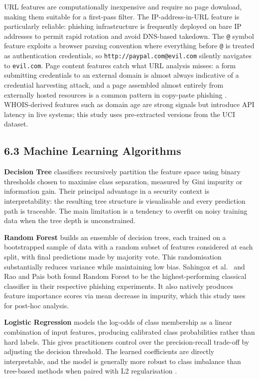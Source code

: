 \documentclass[11pt,letterpaper]{article}
\begin{document}
URL features are computationally inexpensive and require no page download, making them suitable for a first-pass filter. The IP-address-in-URL feature is particularly reliable: phishing infrastructure is frequently deployed on bare IP addresses to permit rapid rotation and avoid DNS-based takedown. The \texttt{@} symbol feature exploits a browser parsing convention where everything before \texttt{@} is treated as authentication credentials, so \texttt{http://paypal.com@evil.com} silently navigates to \texttt{evil.com}. Page content features catch what URL analysis misses: a form submitting credentials to an external domain is almost always indicative of a credential harvesting attack, and a page assembled almost entirely from externally hosted resources is a common pattern in copy-paste phishing \cite{mohammad2014}. WHOIS-derived features such as domain age are strong signals but introduce API latency in live systems; this study uses pre-extracted versions from the UCI dataset.

\subsection*{6.3 Machine Learning Algorithms}

\textbf{Decision Tree} classifiers recursively partition the feature space using binary thresholds chosen to maximise class separation, measured by Gini impurity or information gain. Their principal advantage in a security context is interpretability: the resulting tree structure is visualisable and every prediction path is traceable. The main limitation is a tendency to overfit on noisy training data when the tree depth is unconstrained.

\textbf{Random Forest} builds an ensemble of decision trees, each trained on a bootstrapped sample of data with a random subset of features considered at each split, with final predictions made by majority vote. This randomisation substantially reduces variance while maintaining low bias. Sahingoz et al.\ \cite{sahingoz2019} and Rao and Pais \cite{rao2019} both found Random Forest to be the highest-performing classical classifier in their respective phishing experiments. It also natively produces feature importance scores via mean decrease in impurity, which this study uses for post-hoc analysis.

\textbf{Logistic Regression} models the log-odds of class membership as a linear combination of input features, producing calibrated class probabilities rather than hard labels. This gives practitioners control over the precision-recall trade-off by adjusting the decision threshold. The learned coefficients are directly interpretable, and the model is generally more robust to class imbalance than tree-based methods when paired with L2 regularisation \cite{abdelnabi2020}.
\end{document}
